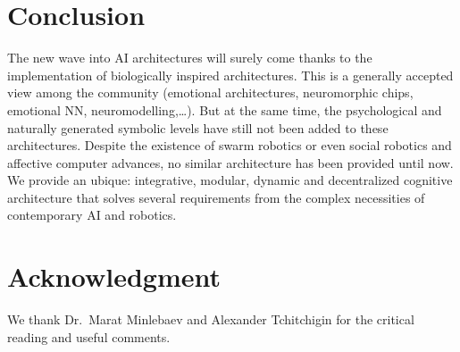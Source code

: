 \section{Conclusion}\label{conclusion}

The new wave into AI architectures will surely come thanks to the
implementation of biologically inspired architectures. This is a
generally accepted view among the community (emotional architectures,
neuromorphic chips, emotional NN, neuromodelling,\ldots{}). But at the
same time, the psychological and naturally generated symbolic levels
have still not been added to these architectures. Despite the existence
of swarm robotics or even social robotics and affective computer
advances, no similar architecture has been provided until now. We
provide an ubique: integrative, modular, dynamic and decentralized
cognitive architecture that solves several requirements from the complex
necessities of contemporary AI and robotics.

\section{Acknowledgment}\label{acknowledgment}

We thank Dr.~Marat Minlebaev and Alexander Tchitchigin for the critical
reading and useful comments.